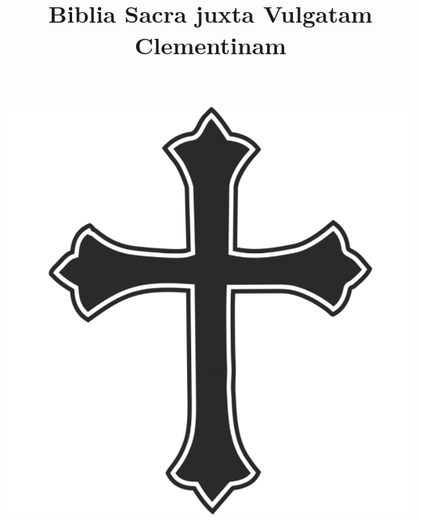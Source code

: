 \documentclass[paper=a5,pagesize=pdftex,15pt,headinclude=on,twoside=off]{scrbook}
\title{Biblia Sacra juxta Vulgatam Clementinam}
\begin{document}
\hspace{0pt}
\vfill
\begin{center}
  \begin{minipage}{0.7\textwidth}
    \begin{center}
      {\headerfont\Huge\@title}
    \end{center}
  \end{minipage}
  \vspace{0.1\pageheight}
  \includegraphics[height=0.4\pageheight]{cross-transparent-vector-5.png}
\end{center}
\vfill
\hspace{0pt}
\clrdouble
\clrdouble
\end{document}
